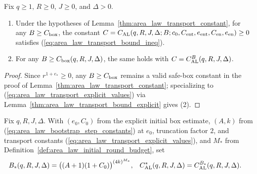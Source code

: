 \begin{lemma}
    \label{thm:area_law_box_bound_constant}
    \leanok
    Fix $q\ge1$, $R\ge0$, $J\ge0$, and $\Delta>0$.
    \begin{enumerate}
        \item Under the hypotheses of Lemma~\ref{thm:area_law_transport_constant}, for any $B\ge C_{\rm box}$, the constant
              $C=C_{\rm AL}(q,R,J,\Delta;B;c_0,C_{\rm ent},e_{\rm ent},C_{\rm en},e_{\rm en})\ge0$ satisfies (\ref{eq:area_law_transport_bound_ineq}).
        \item For any $B\ge C_{\rm box}(q,R,J,\Delta)$, the same holds with
              $C=C_{\rm AL}^B(q,R,J,\Delta)$.
    \end{enumerate}
\end{lemma}
\begin{proof}
    \leanok
    Since $r^{1+e_*}\ge0$, any $B\ge C_{\rm box}$ remains a valid safe-box constant in the proof of Lemma~\ref{thm:area_law_transport_constant}; specializing to (\ref{eq:area_law_transport_explicit_values}) via Lemma~\ref{thm:area_law_transport_bound_explicit} gives (2).
\end{proof}

\begin{definition}
    \label{def:area_law_elementary_constant}
    \leanok
    Fix $q,R,J,\Delta$. With $(e_0,C_0)$ from the explicit initial box estimate, $(A,k)$ from (\ref{eq:area_law_bootstrap_step_constants}) at $e_0$, truncation factor $2$, and transport constants (\ref{eq:area_law_transport_explicit_values}), and $M_*$ from Definition~\ref{def:area_law_initial_round_budget}, set
    \begin{align}
        B_*(q,R,J,\Delta)          & =\bigl((A+1)(1+C_0)\bigr)^{(4k)^{M_*}}, &
        C_{\rm AL}^*(q,R,J,\Delta) & =C_{\rm AL}^{B_*}(q,R,J,\Delta).
        \label{eq:area_law_elementary_constant}
    \end{align}
\end{definition}

